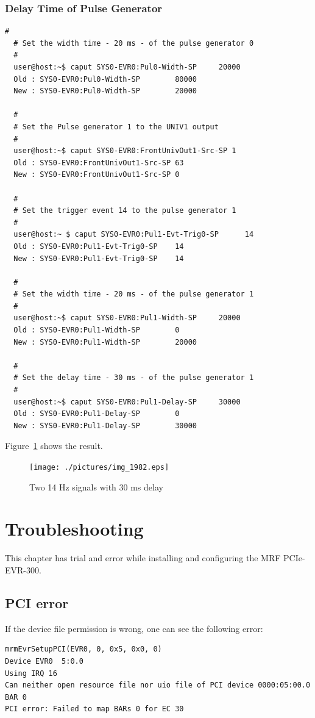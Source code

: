 \documentclass[11pt
  , a4paper
  , article
  , oneside
  , showtrims
]{memoir}
\begin{document}
\subsection{Delay Time of Pulse Generator}

\begin{lstlisting}[style=termstyle]
  #
  # Set the width time - 20 ms - of the pulse generator 0 
  #
  user@host:~$ caput SYS0-EVR0:Pul0-Width-SP     20000
  Old : SYS0-EVR0:Pul0-Width-SP        80000
  New : SYS0-EVR0:Pul0-Width-SP        20000

  #
  # Set the Pulse generator 1 to the UNIV1 output
  # 
  user@host:~$ caput SYS0-EVR0:FrontUnivOut1-Src-SP 1
  Old : SYS0-EVR0:FrontUnivOut1-Src-SP 63
  New : SYS0-EVR0:FrontUnivOut1-Src-SP 0

  #
  # Set the trigger event 14 to the pulse generator 1
  #
  user@host:~ $ caput SYS0-EVR0:Pul1-Evt-Trig0-SP      14
  Old : SYS0-EVR0:Pul1-Evt-Trig0-SP    14
  New : SYS0-EVR0:Pul1-Evt-Trig0-SP    14

  #
  # Set the width time - 20 ms - of the pulse generator 1 
  #
  user@host:~$ caput SYS0-EVR0:Pul1-Width-SP     20000
  Old : SYS0-EVR0:Pul1-Width-SP        0
  New : SYS0-EVR0:Pul1-Width-SP        20000

  #
  # Set the delay time - 30 ms - of the pulse generator 1 
  #
  user@host:~$ caput SYS0-EVR0:Pul1-Delay-SP     30000
  Old : SYS0-EVR0:Pul1-Delay-SP        0
  New : SYS0-EVR0:Pul1-Delay-SP        30000
\end{lstlisting}
Figure~\ref{fig:delay} shows the result.
\begin{figure}[!ht]
  \centering
    \texttt{[image: ./pictures/img\_1982.eps]}
  \caption{Two 14 Hz signals with 30 ms delay}
  \label{fig:delay}
\end{figure}

\chapter{Troubleshooting}
This chapter has trial and error while installing and configuring the MRF PCIe-EVR-300.

\section{PCI error}
If the device file permission is wrong, one can see the following error:
\begin{lstlisting}
mrmEvrSetupPCI(EVR0, 0, 0x5, 0x0, 0)
Device EVR0  5:0.0
Using IRQ 16
Can neither open resource file nor uio file of PCI device 0000:05:00.0 BAR 0
PCI error: Failed to map BARs 0 for EC 30
\end{lstlisting}


\clearpage
\backmatter
%
%
%

%

\end{document}
